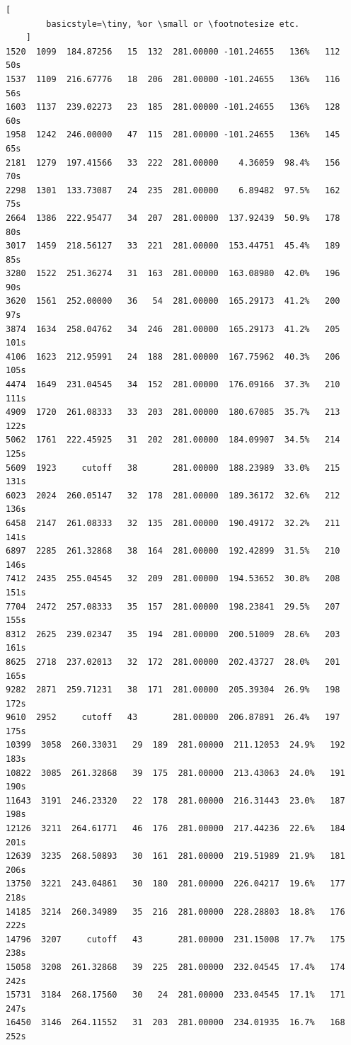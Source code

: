 \documentclass{article}
\begin{document}
\begin{lstlisting}[
        basicstyle=\tiny, %or \small or \footnotesize etc.
    ]
1520  1099  184.87256   15  132  281.00000 -101.24655   136%   112   50s
1537  1109  216.67776   18  206  281.00000 -101.24655   136%   116   56s
1603  1137  239.02273   23  185  281.00000 -101.24655   136%   128   60s
1958  1242  246.00000   47  115  281.00000 -101.24655   136%   145   65s
2181  1279  197.41566   33  222  281.00000    4.36059  98.4%   156   70s
2298  1301  133.73087   24  235  281.00000    6.89482  97.5%   162   75s
2664  1386  222.95477   34  207  281.00000  137.92439  50.9%   178   80s
3017  1459  218.56127   33  221  281.00000  153.44751  45.4%   189   85s
3280  1522  251.36274   31  163  281.00000  163.08980  42.0%   196   90s
3620  1561  252.00000   36   54  281.00000  165.29173  41.2%   200   97s
3874  1634  258.04762   34  246  281.00000  165.29173  41.2%   205  101s
4106  1623  212.95991   24  188  281.00000  167.75962  40.3%   206  105s
4474  1649  231.04545   34  152  281.00000  176.09166  37.3%   210  111s
4909  1720  261.08333   33  203  281.00000  180.67085  35.7%   213  122s
5062  1761  222.45925   31  202  281.00000  184.09907  34.5%   214  125s
5609  1923     cutoff   38       281.00000  188.23989  33.0%   215  131s
6023  2024  260.05147   32  178  281.00000  189.36172  32.6%   212  136s
6458  2147  261.08333   32  135  281.00000  190.49172  32.2%   211  141s
6897  2285  261.32868   38  164  281.00000  192.42899  31.5%   210  146s
7412  2435  255.04545   32  209  281.00000  194.53652  30.8%   208  151s
7704  2472  257.08333   35  157  281.00000  198.23841  29.5%   207  155s
8312  2625  239.02347   35  194  281.00000  200.51009  28.6%   203  161s
8625  2718  237.02013   32  172  281.00000  202.43727  28.0%   201  165s
9282  2871  259.71231   38  171  281.00000  205.39304  26.9%   198  172s
9610  2952     cutoff   43       281.00000  206.87891  26.4%   197  175s
10399  3058  260.33031   29  189  281.00000  211.12053  24.9%   192  183s
10822  3085  261.32868   39  175  281.00000  213.43063  24.0%   191  190s
11643  3191  246.23320   22  178  281.00000  216.31443  23.0%   187  198s
12126  3211  264.61771   46  176  281.00000  217.44236  22.6%   184  201s
12639  3235  268.50893   30  161  281.00000  219.51989  21.9%   181  206s
13750  3221  243.04861   30  180  281.00000  226.04217  19.6%   177  218s
14185  3214  260.34989   35  216  281.00000  228.28803  18.8%   176  222s
14796  3207     cutoff   43       281.00000  231.15008  17.7%   175  238s
15058  3208  261.32868   39  225  281.00000  232.04545  17.4%   174  242s
15731  3184  268.17560   30   24  281.00000  233.04545  17.1%   171  247s
16450  3146  264.11552   31  203  281.00000  234.01935  16.7%   168  252s

\end{lstlisting}
\end{document}
